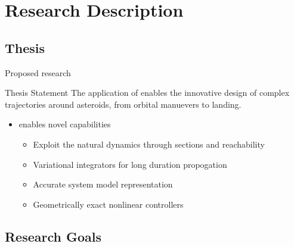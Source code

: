 
\section*{Research Description}
\subsection*{Thesis}

\begin{frame}[t]{Proposed research}
    \begin{block}{Thesis Statement}
        The application of  enables the innovative design of complex trajectories around asteroids, from orbital manuevers to landing.
    \end{block}
    \pause
    \begin{itemize}
        \item {} enables novel capabilities
        \begin{itemize}     
            \item Exploit the natural dynamics through \Poincare sections and reachability
            \item Variational integrators for long duration propogation
            \item Accurate system model representation
            \item Geometrically exact nonlinear controllers
        \end{itemize}
    \end{itemize}

\end{frame}

\subsection*{Research Goals}

